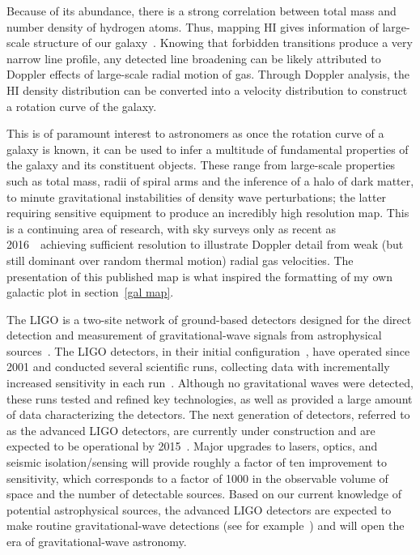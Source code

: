 \documentclass[prd, twocolumn, lengthcheck, superscriptaddress, showpacs, letterpaper, nofootinbib]{revtex4-1}
\begin{document}
Because of its abundance, there is a strong correlation between total mass and number density of hydrogen atoms. Thus, mapping HI gives information of large-scale structure of our galaxy~\cite{1}. Knowing that forbidden transitions produce a very narrow line profile, any detected line broadening can be likely attributed to Doppler effects of large-scale radial motion of gas. Through Doppler analysis, the HI density distribution can be converted into a velocity distribution to construct a rotation curve of the galaxy.

This is of paramount interest to astronomers as once the rotation curve of a galaxy is known, it can be used to infer a multitude of fundamental properties of the galaxy and its constituent objects. These range from large-scale properties such as total mass, radii of spiral arms and the inference of a halo of dark matter, to minute gravitational instabilities of density wave perturbations; the latter requiring sensitive equipment to produce an incredibly high resolution map. This is a continuing area of research, with sky surveys only as recent as 2016~\cite{8}~achieving sufficient resolution to illustrate Doppler detail from weak (but still dominant over random thermal motion) radial gas velocities. The presentation of this published map is what inspired the formatting of my own galactic plot in section~\ref{gal map}.

The \ac{LIGO} is a two-site network of ground-based detectors designed for the direct detection and measurement of gravitational-wave signals from astrophysical sources~\cite{Abbott:2007kv, 0264-9381-27-8-084006}. The \ac{LIGO} detectors, in their initial configuration~\cite{Abbott:2007kv}, have operated since 2001 and conducted several scientific runs, collecting data with incrementally increased sensitivity in each run~\cite{Abbott:2007kv,PSD:S5,Collaboration:2012wu}. Although no gravitational waves were detected, these runs tested and refined key technologies, as well as provided a large amount of data characterizing the detectors. The next generation of detectors, referred to as the advanced \ac{LIGO} detectors, are currently under construction and are expected to be operational by 2015~\cite{Abbott:2007kv, 0264-9381-27-8-084006}. Major upgrades to lasers, optics, and seismic isolation/sensing will provide roughly a factor of ten improvement to sensitivity, which corresponds to a factor of 1000 in the observable volume of space and the number of detectable sources. Based on our current knowledge of potential astrophysical sources, the advanced \ac{LIGO} detectors are expected to make routine gravitational-wave detections (see for example~\cite{ratesdoc}) and will open the era of gravitational-wave astronomy. 
\end{document}
